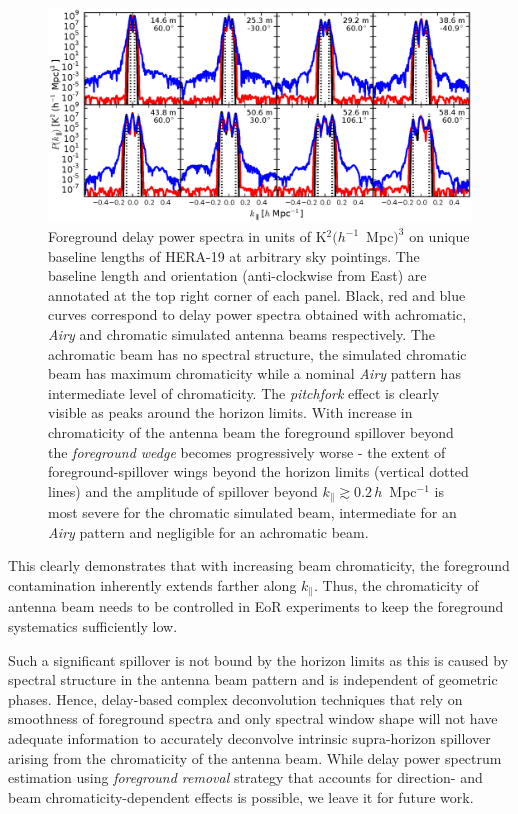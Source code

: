 \documentclass[preprint2,iop,numberedappendix,twocolappendix,appendixfloats]{emulateapj}
\begin{document}
\begin{figure}[htb]
  \centering
  \includegraphics[width=\linewidth]{f2.eps}
  \caption{Foreground delay power spectra in units of K$^2 (h^{-1}$~Mpc$)^3$ on unique baseline lengths of HERA-19 at arbitrary sky pointings. The baseline length and orientation (anti-clockwise from East) are annotated at the top right corner of each panel. Black, red and blue curves correspond to delay power spectra obtained with achromatic, {\it Airy} and chromatic simulated antenna beams respectively. The achromatic beam has no spectral structure, the simulated chromatic beam has maximum chromaticity while a nominal {\it Airy} pattern has intermediate level of chromaticity. The {\it pitchfork} effect is clearly visible as peaks around the horizon limits. With increase in chromaticity of the antenna beam the foreground spillover beyond the {\it foreground wedge} becomes progressively worse - the extent of foreground-spillover wings beyond the horizon limits (vertical dotted lines) and the amplitude of spillover beyond $k_\parallel\gtrsim 0.2\,h$~Mpc$^{-1}$ is most severe for the chromatic simulated beam, intermediate for an {\it Airy} pattern and negligible for an achromatic beam.}
  \label{fig:asm-dps-beam-chromaticity-baselines}
\end{figure}

This clearly demonstrates that with increasing beam chromaticity, the foreground contamination inherently extends farther along $k_\parallel$. Thus, the chromaticity of antenna beam needs to be controlled in EoR experiments to keep the foreground systematics sufficiently low.

Such a significant spillover is not bound by the horizon limits as this is caused by spectral structure in the antenna beam pattern and is independent of geometric phases. Hence, delay-based complex deconvolution techniques \citep{par09,par12b} that rely on smoothness of foreground spectra and only spectral window shape will not have adequate information to accurately deconvolve intrinsic supra-horizon spillover arising from the chromaticity of the antenna beam. While delay power spectrum estimation using {\it foreground removal} strategy that accounts for direction- and beam chromaticity-dependent effects is possible, we leave it for future work.
\end{document}

